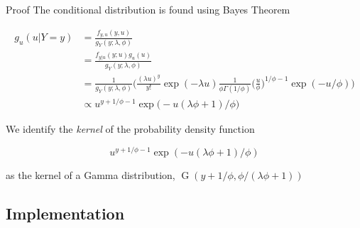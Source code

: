 \documentclass[aspectratio=169]{beamer}
\DeclareMathOperator{\G}{G}
\begin{document}
\begin{frame}{Proof}
\protect\hypertarget{proof-3}{}
The conditional distribution is found using Bayes Theorem

\begin{equation}
  \begin{aligned}
    g_{u}(u|Y=y)&=\frac{f_{y,u}(y,u)}{g_Y(y;\lambda, \phi)} \\
    &=\frac{f_{y|u}(y;u)g_{u}(u)}{g_{Y}(y;\lambda,\phi)} \\
    &=\frac{1}{g_{Y}(y;\lambda,\phi)}\bigg(\frac{(\lambda u)^y}{y!} \exp (-\lambda u) \frac{1}{\phi \Gamma(1/\phi)} \bigg(\frac{u}{\phi}\bigg)^{1/\phi-1} \exp (-u/\phi)\bigg) \\
    &\propto u^{y+1/\phi-1} \exp \big(- u(\lambda\phi+1)/\phi\big)
  \end{aligned}
\end{equation}

We identify the \emph{kernel} of the probability density function

\begin{equation}
  u^{y+1/\phi-1} \exp (- u(\lambda\phi+1)/\phi)
\end{equation}

as the kernel of a Gamma distribution,
\(\G(y+1/\phi,\phi/(\lambda\phi+1))\)
\end{frame}

\hypertarget{implementation-1}{%
\subsection{Implementation}\label{implementation-1}}
\end{document}
